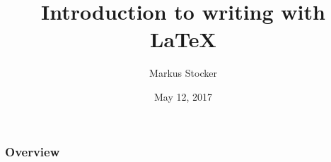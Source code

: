 \documentclass{beamer}
\title{Introduction to writing with LaTeX}
\author{Markus Stocker}
\date{May 12, 2017}
\begin{document}
\maketitle

\begin{frame}
  \frametitle{Overview}

\end{frame}
\end{document}
